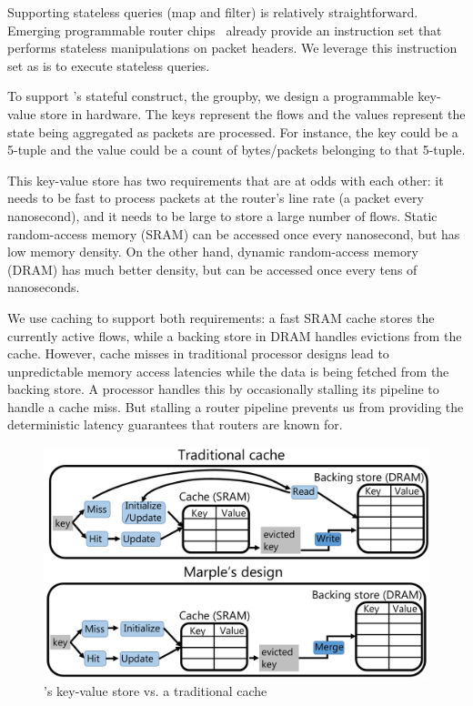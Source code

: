 Supporting stateless queries ({\ct map} and {\ct filter}) is relatively
straightforward. Emerging programmable router chips~\cite{rmt, xpliant,
flexpipe, tofino} already provide an instruction set that performs stateless
manipulations on packet headers. We leverage this instruction set as is to
execute stateless queries.

To support \TheSystem's stateful construct, the {\ct groupby}, we design a
programmable key-value store in hardware. The keys represent the flows and the
values represent the state being aggregated as packets are processed. For
instance, the key could be a 5-tuple and the value could be a count of
bytes/packets belonging to that 5-tuple.

This key-value store has two requirements that are at odds with each other: it
needs to be fast to process packets at the router's line rate (a packet every
nanosecond), and it needs to be large to store a large number of flows. Static
random-access memory (SRAM) can be accessed once every nanosecond, but has low
memory density. On the other hand, dynamic random-access memory (DRAM) has much
better density, but can be accessed once every tens of nanoseconds.

We use caching to support both requirements: a fast SRAM cache stores the
currently active flows, while a backing store in DRAM handles evictions from
the cache. However, cache misses in traditional processor designs lead to
unpredictable memory access latencies while the data is being fetched from the
backing store. A processor handles this by occasionally stalling its pipeline
to handle a cache miss. But stalling a router pipeline prevents us from
providing the deterministic latency guarantees that routers are known for.

\begin{figure}
\centering
\includegraphics[width=0.6\columnwidth]{pq_kv_store.pdf}
\caption{\TheSystem's key-value store vs. a traditional cache}
\label{fig:hw_diff}
\end{figure}

